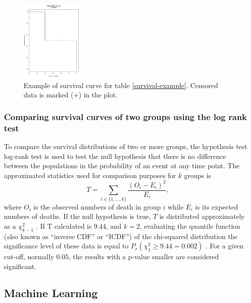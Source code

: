 \begin{figure}
\centering
\includegraphics[width=0.5\linewidth,height=4cm]{images/example_survival.pdf}
\caption[Example of survival curve.]{
Example of survival curve for table \ref{survival-example}. Censored data is marked (+) in the plot.}
\end{figure}




\subsubsection{Comparing survival curves of two groups using the log rank test}

 To compare the survival distributions of two or more groups,  the hypothesis test log-rank test is
 used to test the null hypothesis that there is no difference between the populations
 in the probability of an event at any time point.
%
 The approximated statistics used for comparison purposes for $k$ groups is
 $$T = \sum_{i \in \{1,\ldots,k\}}\frac{(O_i - E_i)^2}{E_i},$$
 where $O_i$ is the observed numbers of death in  group $i$
 while $E_i$ is its expected numbers of deaths.
 If the null hypothesis is true, $T$ is distributed approximately as a $\chi^2_{k-1}$ \cite{matthews1996using}.
If T calculated is $9.44$, and $k = 2$,  evaluating the quantile function (also known as “inverse CDF” or “ICDF”) of the chi-squared distribution the significance level of these data is equal to
$P_r(\chi^2_{1}\geq9.44 = 0.002)$ \cite{yau2012r}.
For a given cut-off, normally $0.05$, the results with a p-value smaller are considered significant.

\subsection{Machine Learning}


